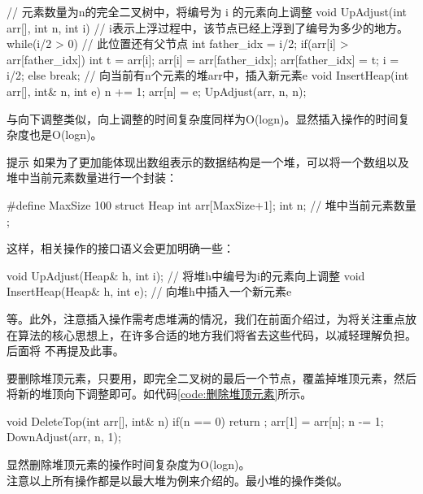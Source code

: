 \begin{cppcodeNum}[label={code:向上调整及插入操作}, codetitle={向上调整及插入操作}]
// 元素数量为n的完全二叉树中，将编号为 i 的元素向上调整
    void UpAdjust(int arr[], int n, int i) {
        // i表示上浮过程中，该节点已经上浮到了编号为多少的地方。
        while(i/2 > 0) {    // 此位置还有父节点
            int father_idx = i/2;
            if(arr[i] > arr[father_idx]) {
                int t = arr[i];
                arr[i] = arr[father_idx];
                arr[father_idx] = t;
                i = i/2;
            }
            else {
                break;
            }
        }
    }
    // 向当前有n个元素的堆arr中，插入新元素e
    void InsertHeap(int arr[], int& n, int e) {
        n += 1;
        arr[n] = e;
        UpAdjust(arr, n, n);
    }
\end{cppcodeNum}
与向下调整类似，向上调整的时间复杂度同样为O(logn)。显然插入操作的时间复杂度也是O(logn)。

\begin{notebox}{提示}
    如果为了更加能体现出数组表示的数据结构是一个堆，可以将一个数组以及堆中当前元素数量进行一个封装：
    \begin{cppcode}
    #define MaxSize 100
        struct Heap {
            int arr[MaxSize+1];
            int n;  // 堆中当前元素数量
        };
    \end{cppcode}
    这样，相关操作的接口语义会更加明确一些：
    \begin{cppcode}
        void UpAdjust(Heap& h, int i);  // 将堆h中编号为i的元素向上调整
        void InsertHeap(Heap& h, int e); // 向堆h中插入一个新元素e
    \end{cppcode}
    等。此外，注意插入操作需考虑堆满的情况，我们在前面介绍过，为将关注重点放在算法的核心思想上，在许多合适的地方我们将省去这些代码，以减轻理解负担。后面将
    不再提及此事。
\end{notebox}

要删除堆顶元素，只要用，即完全二叉树的最后一个节点，覆盖掉堆顶元素，然后将新的堆顶向下调整即可。如代码\ref{code:删除堆顶元素}所示。
\begin{cppcodeNum}[label={code:删除堆顶元素}, codetitle={删除堆顶元素}]
    void DeleteTop(int arr[], int& n) {
        if(n == 0) return ;
        arr[1] = arr[n];
        n -= 1;
        DownAdjust(arr, n, 1);
    }
\end{cppcodeNum}
显然删除堆顶元素的操作时间复杂度为O(logn)。\\

注意以上所有操作都是以最大堆为例来介绍的。最小堆的操作类似。

